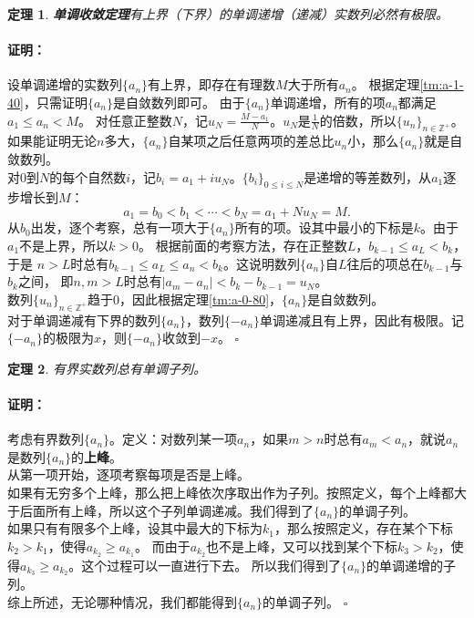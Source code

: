 \documentclass[12pt,UTF8]{ctexbook}
\newtheorem{tm}{定理}[section]
\renewenvironment{proof}{\paragraph{\textbf{证明：}}}{\hfill$\square$}
\begin{document}
\begin{appendix}
\begin{tm}\textbf{单调收敛定理}\label{tm:a-2-10}
    有上界（下界）的单调递增（递减）实数列必然有极限。
\end{tm}
\begin{proof}
    设单调递增的实数列$\{a_n\}$有上界，即存在有理数$M$大于所有$a_n$。
    根据定理\ref{tm:a-1-40}，只需证明$\{a_n\}$是自敛数列即可。
    由于$\{a_n\}$单调递增，所有的项$a_n$都满足$a_1\leqslant a_n < M$。
    对任意正整数$N$，记$u_N = \frac{M - a_1}{N}$。$u_N$是$\frac{1}{N}$的倍数，所以$\{u_n\}_{n\in\mathbb{Z}^+}$。
    如果能证明无论$n$多大，$\{a_n\}$自某项之后任意两项的差总比$u_n$小，那么$\{a_n\}$就是自敛数列。\\
    对$0$到$N$的每个自然数$i$，记$b_i = a_1 + iu_N$。$\{b_i\}_{0\leqslant i\leqslant N}$是递增的等差数列，从$a_1$逐步增长到$M$：
    $$ a_1 = b_0 < b_1 < \cdots < b_N = a_1 + Nu_N = M.$$
    从$b_0$出发，逐个考察，总有一项大于$\{a_n\}$所有的项。设其中最小的下标是$k$。由于$a_1$不是上界，所以$k>0$。
    根据前面的考察方法，存在正整数$L$，$b_{k-1} \leqslant a_L < b_k$，于是
    $n>L$时总有$b_{k-1} \leqslant a_L \leqslant a_n < b_k$。这说明数列$\{a_n\}$自$L$往后的项总在$b_{k-1}$与$b_k$之间，
    即$n,m>L$时总有$|a_m - a_n| < b_k - b_{k-1} = u_N$。\\
    数列$\{u_n\}_{n\in\mathbb{Z}^+}$趋于$0$，因此根据定理\ref{tm:a-0-80}，$\{a_n\}$是自敛数列。\\
    对于单调递减有下界的数列$\{a_n\}$，数列$\{-a_n\}$单调递减且有上界，因此有极限。记$\{-a_n\}$的极限为$x$，则$\{-a_n\}$收敛到$-x$。
\end{proof}

\begin{tm}\label{tm:a-2-20}
    有界实数列总有单调子列。
\end{tm}
\begin{proof}
    考虑有界数列$\{a_n\}$。定义：对数列某一项$a_n$，如果$m>n$时总有$a_m < a_n$，就说$a_n$是数列$\{a_n\}$的\textbf{上峰}。\\
    从第一项开始，逐项考察每项是否是上峰。\\
    如果有无穷多个上峰，那么把上峰依次序取出作为子列。按照定义，每个上峰都大于后面所有上峰，所以这个子列单调递减。我们得到了$\{a_n\}$的单调子列。\\
    如果只有有限多个上峰，设其中最大的下标为$k_1$，那么按照定义，存在某个下标$k_2 > k_1$，使得$a_{k_2} \geqslant a_{k_1}$。
    而由于$a_{k_2}$也不是上峰，又可以找到某个下标$k_3 > k_2$，使得$a_{k_3} \geqslant a_{k_2}$。这个过程可以一直进行下去。
    所以我们得到了$\{a_n\}$的单调递增的子列。\\
    综上所述，无论哪种情况，我们都能得到$\{a_n\}$的单调子列。
\end{proof}


\end{appendix}
\end{document}
